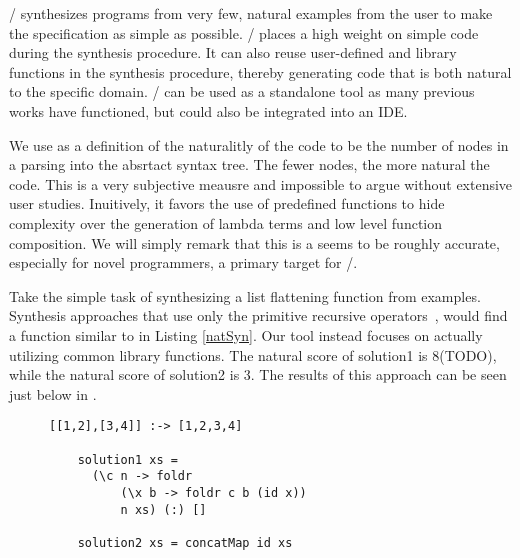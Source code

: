 \ourTool/ synthesizes programs from very few, natural examples from the user to make the specification as simple as possible.
\ourTool/ places a high weight on simple code during the synthesis procedure.
It can also reuse user-defined and library functions in the synthesis procedure, thereby generating code that is both natural to the specific domain.
\ourTool/ can be used as a standalone tool as many previous works have functioned, but could also be integrated into an IDE.

We use as a definition of the naturalitly of the code to be the number of nodes in a parsing into the absrtact syntax tree.
The fewer nodes, the more natural the code.
This is a very subjective meausre and impossible to argue without extensive user studies.
Inuitively, it favors the use of predefined functions to hide complexity over the generation of lambda terms and low level function composition.
We will simply remark that this is a seems to be roughly accurate, especially for novel programmers, a primary target for \ourTool/.


Take the simple task of synthesizing a list flattening function from examples.
Synthesis approaches that use only the primitive recursive operators~\cite{Osera:2015,FeserCD15}, would find a function similar to  in Listing \ref{natSyn}.
Our tool instead focuses on actually utilizing common library functions.
The natural score of solution1 is 8(TODO), while the natural score of solution2 is 3.
The results of this approach can be seen just below in .

\begin{figure}
  \begin{lstlisting}[caption=Low-level synthesis vs. Natural synthesis,label=natSyn]
    [[1,2],[3,4]] :-> [1,2,3,4]

    solution1 xs =
      (\c n -> foldr
          (\x b -> foldr c b (id x))
          n xs) (:) []

    solution2 xs = concatMap id xs
    \end{lstlisting}
\end{figure}


